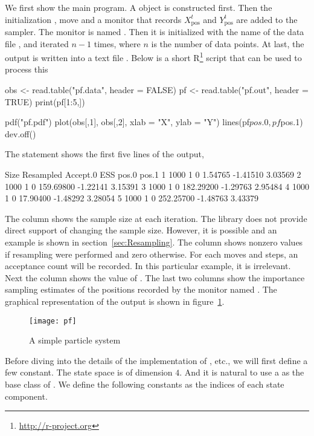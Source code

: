\documentclass[11pt,bib,mint,hyper,altcolor]{marticle}
\def\xpos{X_{\mathrm{pos}}}
\def\ypos{Y_{\mathrm{pos}}}
\begin{document}
We first show the main program.
A  object is constructed first. Then the
initialization , move  and a monitor
 that records $\xpos^t$ and $\ypos^t$ are added to the
sampler. The monitor is named . Then it is initialized with
the name of the data file , and iterated $n - 1$ times,
where $n$ is the number of data points. At last, the output is written into a
text file . Below is a short
R\footnote{\url{http://r-project.org}} script that can be used to process this
\begin{rcode}
  obs <- read.table("pf.data", header = FALSE)
  pf <- read.table("pf.out", header = TRUE)
  print(pf[1:5,])

  pdf("pf.pdf")
  plot(obs[,1], obs[,2], xlab = "X", ylab = "Y")
  lines(pf$pos.0, pf$pos.1)
  dev.off()
\end{rcode}
The  statement shows the first five lines of the output,
\begin{routcode}
    Size Resampled Accept.0       ESS    pos.0   pos.1
  1 1000         1        0   1.54765 -1.41510 3.03569
  2 1000         1        0 159.69800 -1.22141 3.15391
  3 1000         1        0 182.29200 -1.29763 2.95484
  4 1000         1        0  17.90400 -1.48292 3.28054
  5 1000         1        0 252.25700 -1.48763 3.43379
\end{routcode}
The column  shows the sample size at each iteration. The
library does not provide direct support of changing the sample size. However,
it is possible and an example is shown in section~\ref{sec:Resampling}. The
column  shows nonzero values if resampling were performed
and zero otherwise. For each moves and \mcmc steps, an acceptance count will be
recorded. In this particular example, it is irrelevant. Next the column
 shows the value of \ess. The last two columns show the
importance sampling estimates of the positions recorded by the monitor named
. The graphical representation of the output is shown in
figure~\ref{fig:pf}.

\begin{figure}
  \texttt{[image: pf]}
  \caption{A simple particle system}
  \label{fig:pf}
\end{figure}

Before diving into the details of the implementation of ,
etc., we will first define a few constant. The state space is of dimension $4$.
And it is natural to use a  as the base class of
. We define the following constants as the indices of each
state component.
\end{document}
